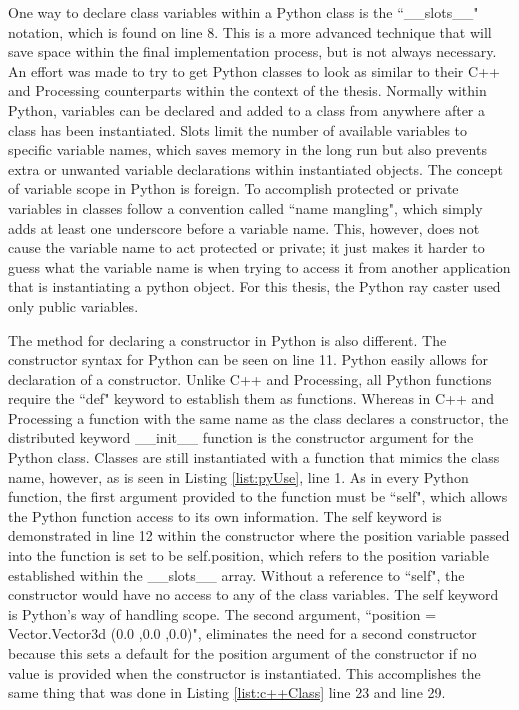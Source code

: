 One way to declare class variables within a Python class is the ``\_\_slots\_\_" notation, which is found on line 8.  This is a more advanced technique that will save space within the final implementation process, but is not always necessary.  An effort was made to try to get Python classes to look as similar to their C++ and Processing counterparts within the context of the thesis.  Normally within Python, variables can be declared and added to a class from anywhere after a class has been instantiated.  Slots limit the number of available variables to specific variable names, which saves memory in the long run but also prevents extra or unwanted variable declarations within instantiated objects.  The concept of variable scope in Python is foreign.  To accomplish protected or private variables in classes follow a convention called ``name mangling", which simply adds at least one underscore before a variable name. This, however, does not cause the variable name to act protected or private; it just makes it harder to guess what the variable name is when trying to access it from another application that is instantiating a python object.  For this thesis, the Python ray caster used only public variables.

The method for declaring a constructor in Python is also different.  The constructor syntax for Python can be seen on line 11.  Python easily allows for declaration of a constructor.  Unlike C++ and Processing, all Python functions require the ``def" keyword to establish them as functions.  Whereas in C++ and Processing a function with the same name as the class declares a constructor, the distributed keyword \_\_init\_\_ function is the constructor argument for the Python class.  Classes are still instantiated with a function that mimics the class name, however, as is seen in Listing \ref{list:pyUse}, line 1.  As in every Python function, the first argument provided to the function must be ``self", which allows the Python function access to its own information.  The self keyword is demonstrated in line 12 within the constructor where the position variable passed into the function is set to be self.position, which refers to the position variable established within the \_\_slots\_\_ array.  Without a reference to ``self", the constructor would have no access to any of the class variables.  The self keyword is Python's way of handling scope.  The second argument, ``position = Vector.Vector3d (0.0 ,0.0 ,0.0)", eliminates the need for a second constructor because this sets a default for the position argument of the constructor if no value is provided when the constructor is instantiated.  This accomplishes the same thing that was done in Listing \ref{list:c++Class} line 23 and line 29.

